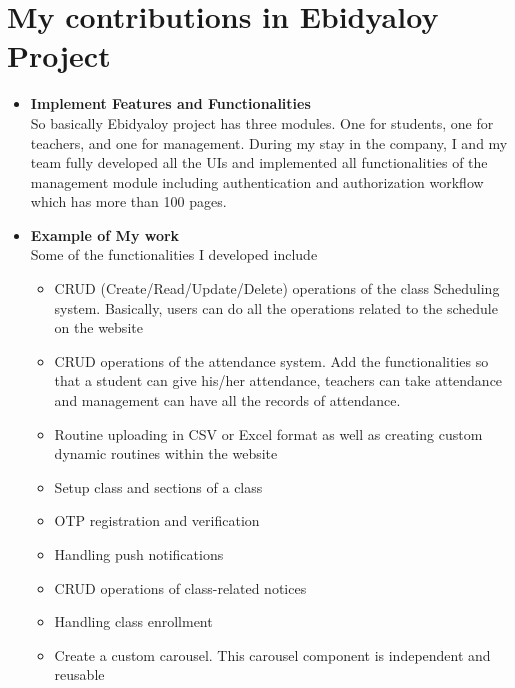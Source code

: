 \section{My contributions in Ebidyaloy Project}
\begin{flushleft}
\begin{itemize}
    \item \textbf{Implement Features and Functionalities}\\
    \vspace{6pt}
So basically Ebidyaloy project has three modules. One for students, one for teachers,
and one for management. During my stay in the company, I and my team fully developed
all the UIs and implemented all functionalities of the management module including
authentication and authorization workflow which has more than 100 pages.
\end{itemize}
\begin{itemize}
    \item \textbf{Example of My work}\\
    Some of the functionalities I developed include
    \begin{itemize}
        \item CRUD (Create/Read/Update/Delete) operations of the class Scheduling system.
Basically, users can do all the operations related to the schedule on the website
\item CRUD operations of the attendance system. Add the functionalities so that a
student can give his/her attendance, teachers can take attendance and
management can have all the records of attendance.
\item Routine uploading in CSV or Excel format as well as creating custom dynamic
routines within the website
\item Setup class and sections of a class
\item OTP registration and verification
\item Handling push notifications
\item CRUD operations of class-related notices
\item Handling class enrollment
\item Create a custom carousel. This carousel component is independent and reusable
    \end{itemize}




\end{itemize}
\end{flushleft}
